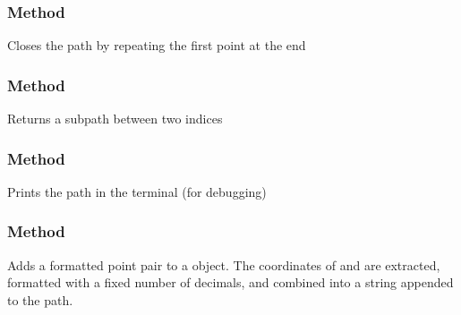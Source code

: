 \subsubsection{Method }
\label{ssub:method_tkzmeth_path_close}

Closes the path by repeating the first point at the end

\begin{tkzexample}[latex=.3\textwidth]
\end{tkzexample}

\subsubsection{Method }
\label{ssub:method_tkzmeth_path_sub_i1_i2}

Returns a subpath between two indices


\begin{tkzexample}[latex=.3\textwidth]
\end{tkzexample}


\subsubsection{Method }
\label{ssub:method_tkzmeth_path_show}

Prints the path in the terminal (for debugging)

\begin{tkzexample}[latex=.45\textwidth]
\end{tkzexample}

\subsubsection{Method }
\label{ssub:subsubsection_name}
Adds a formatted point pair to a  object. The coordinates of  and  are extracted, formatted with a fixed number of decimals, and combined into a string  appended to the path.

